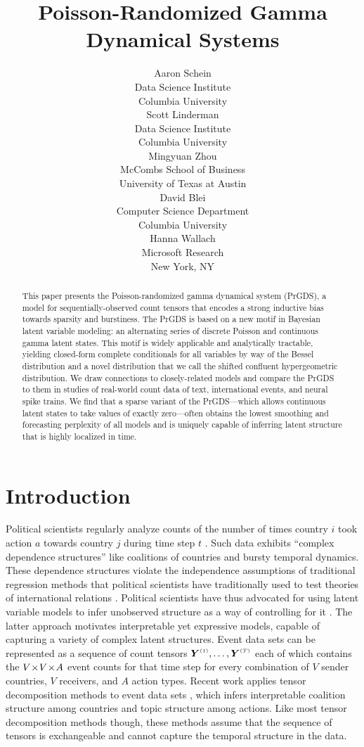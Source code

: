 \documentclass{article}
\title{Poisson-Randomized Gamma Dynamical Systems}
\author{%
  Aaron Schein \\
  Data Science Institute\\
  Columbia University\\
  \And
  Scott Linderman \\
  Data Science Institute\\
  Columbia University\\
  \AND
  Mingyuan Zhou \\
  McCombs School of Business\\
  University of Texas at Austin\\
  \And
  David Blei \\
  Computer Science Department\\
  Columbia University\\
  \And
  Hanna Wallach \\
  Microsoft Research\\
  New York, NY\\
}
\begin{document}
\maketitle

\begin{abstract}
This paper presents the Poisson-randomized gamma dynamical system (PrGDS), a model for sequentially-observed count tensors that encodes a strong inductive bias towards sparsity and burstiness. The PrGDS is based on a new motif in Bayesian latent variable modeling: an alternating series of discrete Poisson and continuous gamma latent states. This motif is widely applicable and analytically tractable, yielding closed-form complete conditionals for all variables by way of the Bessel distribution and a novel distribution that we call the shifted confluent hypergeometric distribution. We draw connections to closely-related models and compare the PrGDS to them in studies of real-world count data of text, international events, and neural spike trains. We find that a sparse variant of the PrGDS---which allows continuous latent states to take values of exactly zero---often obtains the lowest smoothing and forecasting perplexity of all models and is uniquely capable of inferring latent structure that is highly localized in time.~
\end{abstract}

\section{Introduction}

Political scientists regularly analyze counts of the number of times country $i$ took action $a$ towards country $j$ during time step $t$ \cite{schrodt1995event}. Such data exhibits ``complex dependence structures'' \cite{king2001proper} like coalitions of countries and bursty temporal dynamics. These dependence structures violate the independence assumptions of traditional regression methods that political scientists have traditionally used to test theories of international relations \cite{green2001dirty,poast2010mis,erikson2014dyadic}. Political scientists have thus advocated for using latent variable models to infer unobserved structure as a way of controlling for it \cite{stewart2014latent}. The latter approach motivates interpretable yet expressive models, capable of capturing a variety of complex latent structures. Event data sets can be represented as a sequence of count tensors $\Yten^{\mathsmaller{(1)}},\dots,\Yten^{\mathsmaller{(T)}}$ each of which contains the $V \!\times\! V \!\times\! A$ event counts for that time step for every combination of $V$ sender countries, $V$ receivers, and $A$ action types. Recent work applies tensor decomposition methods to event data sets \cite{hoff2004modeling,hoff2015multilinear,schein2015bayesian,hoff2016equivariant,schein2016bayesian}, which infers interpretable coalition structure among countries and topic structure among actions. Like most tensor decomposition methods though, these methods assume that the sequence of tensors is exchangeable and cannot capture the temporal structure in the data.~  
\end{document}
